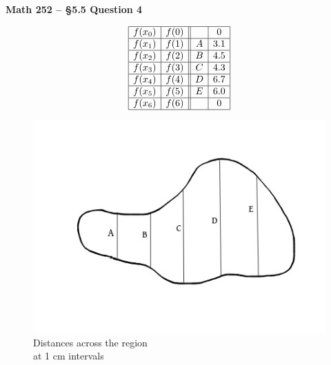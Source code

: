 \documentclass{article}
\begin{document}
\begin{center}
\Large\textbf{Math 252 -- \S 5.5 Question 4}
\end{center}
\vspace{-2 cm}

\begin{figure}[h!]
  \begin{minipage}[c]{0.35\textwidth} %
    \centering %
    \[
    \begin{array}{|c|c||c|c|}
    \hline
    \textstyle f(x_0) & \textstyle f(0) &         & 0   \\ \hline
    \textstyle f(x_1) & \textstyle f(1) & A       & 3.1 \\ \hline
    \textstyle f(x_2) & \textstyle f(2) & B       & 4.5 \\ \hline
    \textstyle f(x_3) & \textstyle f(3) & C       & 4.3 \\ \hline
    \textstyle f(x_4) & \textstyle f(4) & D       & 6.7 \\ \hline
    \textstyle f(x_5) & \textstyle f(5) & E       & 6.0 \\ \hline
    \textstyle f(x_6) & \textstyle f(6) &         & 0   \\ \hline
    \end{array}
    \]
    \caption*{\small Distances across the region\\at 1 cm intervals}
  \end{minipage}\hfill
  \begin{minipage}[c]{0.6\textwidth} %
    \centering %
    \includegraphics[width=\linewidth]{region4.png}

\end{minipage}
\end{figure}
\end{document}
